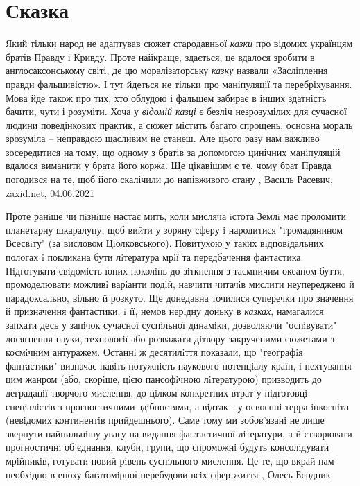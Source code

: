  
 
 
 
 
\chapter{Сказка}
\label{sec:slova.skazka}

Який тільки народ не адаптував сюжет стародавньої \emph{казки} про відомих
українцям братів Правду і Кривду. Проте найкраще, здається, це вдалося зробити
в англосаксонському світі, де цю моралізаторську \emph{казку} назвали
«Засліплення правди фальшивістю». І тут йдеться не тільки про маніпуляції та
перебріхування.  Мова йде також про тих, хто облудою і фальшем забирає в інших
здатність бачити, чути і розуміти. Хоча у \emph{відомій казці} є безліч
незрозумілих для сучасної людини поведінкових практик, а сюжет містить багато
спрощень, основна мораль зрозуміла – неправдою щасливим не станеш. Але цього
разу нам важливо зосередитися на тому, що одному з братів за допомогою цинічних
маніпуляцій вдалося виманити у брата його коржа. Ще цікавішим є те, чому брат
Правда погодився на те, щоб його скалічили до напівживого стану
, Василь Расевич, zaxid.net, 04.06.2021


Проте ранiше чи пiзнiше настає мить, коли мисляча iстота Землi має проломити
планетарну шкаралупу, щоб вийти у зоряну сферу i народитися "громадянином
Всесвiту" (за висловом Цiолковського). Повитухою у таких вiдповiдальних пологах
i покликана бути лiтература мрiї та передбачення фантастика. Пiдготувати
свiдомiсть юних поколiнь до зiткнення з таємничим океаном буття, промоделювати
можливi варiанти подiй, навчити читачiв мислити неупереджено й парадоксально,
вiльно й розкуто. Ще донедавна точилися суперечки про значення й призначення
фантастики, i її, немов нерiдну доньку в \emph{казках}, намагалися запхати десь у
запiчок сучасної суспiльної динамiки, дозволяючи "оспiвувати" досягнення науки,
технологiї або розважати дiтвору закрученими сюжетами з космiчним антуражем.
Останнi ж десятилiття показали, що "географiя фантастики" визначає навiть
потужнiсть наукового потенцiалу країн, i нехтування цим жанром (або, скорiше,
цiєю пансофiчною лiтературою) призводить до деградацiї творчого мислення, до
цiлком конкретних втрат у пiдготовцi спецiалiстiв з прогностичними здiбностями,
а вiдтак - у освоєннi терра iнкогнiта (невiдомих континентiв прийдешнього).
Саме тому ми зобов'язанi не лише звернути найпильнiшу увагу на видання
фантастичної лiтератури, а й створювати прогностичнi об'єднання, клуби, групи,
що спроможнi будуть консолiдувати мрiйникiв, готувати новий рiвень суспiльного
мислення. Це те, що вкрай нам необхiдно в епоху багатомiрної перебудови всiх
сфер життя
, Олесь Бердник
